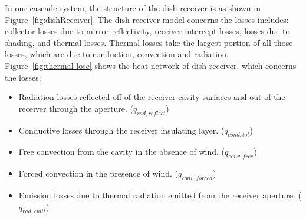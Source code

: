 \documentclass{article}
\begin{document}
In our cascade system, the structure of the dish receiver is as shown in Figure~\ref{fig:dishReceiver}. The dish receiver model concerns the losses includes: collector losses due to mirror reflectivity, receiver intercept losses, losses due to shading, and thermal losses. Thermal losses take the largest portion of all those losses, which are due to conduction, convection and radiation. Figure~\ref{fig:thermal-lose} shows the heat network of dish receiver, which concerns the losses:
\begin{itemize}
	\item Radiation losses reflected off of the receiver cavity surfaces and out of the receiver through the aperture. ($q_{rad,reflect}$)
	\item Conductive losses through the receiver insulating layer. ($q_{cond,tot}$)
	\item Free convection from the cavity in the absence of wind. ($q_{conv,free}$)
	\item Forced convection in the presence of wind. ($q_{conv,forced}$)
	\item Emission losses due to thermal radiation emitted from the receiver aperture. ($q_{rad,emit}$)
\end{itemize}
\end{document}
